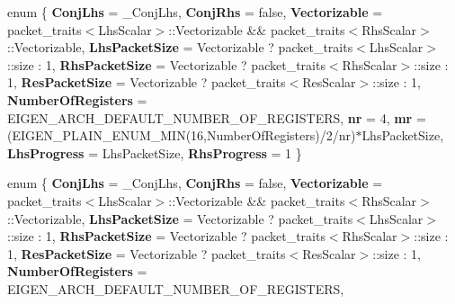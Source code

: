 \begin{DoxyCompactItemize}
\item 
\mbox{\label{class_eigen_1_1internal_1_1gebp__traits_3_01std_1_1complex_3_01_real_scalar_01_4_00_01_real_scald728c008ac4da8a5a1327d1e06be8c1f_a80ead896a5397648ea4a47a4f1d0e569}} 
enum \{ \newline
{\bfseries Conj\+Lhs} = \+\_\+\+Conj\+Lhs, 
{\bfseries Conj\+Rhs} = false, 
{\bfseries Vectorizable} = packet\+\_\+traits$<$Lhs\+Scalar$>$\+:\+:Vectorizable \&\& packet\+\_\+traits$<$Rhs\+Scalar$>$\+:\+:Vectorizable, 
{\bfseries Lhs\+Packet\+Size} = Vectorizable ? packet\+\_\+traits$<$Lhs\+Scalar$>$\+:\+:size \+: 1, 
\newline
{\bfseries Rhs\+Packet\+Size} = Vectorizable ? packet\+\_\+traits$<$Rhs\+Scalar$>$\+:\+:size \+: 1, 
{\bfseries Res\+Packet\+Size} = Vectorizable ? packet\+\_\+traits$<$Res\+Scalar$>$\+:\+:size \+: 1, 
{\bfseries Number\+Of\+Registers} = E\+I\+G\+E\+N\+\_\+\+A\+R\+C\+H\+\_\+\+D\+E\+F\+A\+U\+L\+T\+\_\+\+N\+U\+M\+B\+E\+R\+\_\+\+O\+F\+\_\+\+R\+E\+G\+I\+S\+T\+E\+RS, 
{\bfseries nr} = 4, 
\newline
{\bfseries mr} = (E\+I\+G\+E\+N\+\_\+\+P\+L\+A\+I\+N\+\_\+\+E\+N\+U\+M\+\_\+\+M\+IN(16,Number\+Of\+Registers)/2/nr)$\ast$\+Lhs\+Packet\+Size, 
{\bfseries Lhs\+Progress} = Lhs\+Packet\+Size, 
{\bfseries Rhs\+Progress} = 1
 \}
\item 
\mbox{\label{class_eigen_1_1internal_1_1gebp__traits_3_01std_1_1complex_3_01_real_scalar_01_4_00_01_real_scald728c008ac4da8a5a1327d1e06be8c1f_a4f484ea0a1da743b742ecf4c77f84630}} 
enum \{ \newline
{\bfseries Conj\+Lhs} = \+\_\+\+Conj\+Lhs, 
{\bfseries Conj\+Rhs} = false, 
{\bfseries Vectorizable} = packet\+\_\+traits$<$Lhs\+Scalar$>$\+:\+:Vectorizable \&\& packet\+\_\+traits$<$Rhs\+Scalar$>$\+:\+:Vectorizable, 
{\bfseries Lhs\+Packet\+Size} = Vectorizable ? packet\+\_\+traits$<$Lhs\+Scalar$>$\+:\+:size \+: 1, 
\newline
{\bfseries Rhs\+Packet\+Size} = Vectorizable ? packet\+\_\+traits$<$Rhs\+Scalar$>$\+:\+:size \+: 1, 
{\bfseries Res\+Packet\+Size} = Vectorizable ? packet\+\_\+traits$<$Res\+Scalar$>$\+:\+:size \+: 1, 
{\bfseries Number\+Of\+Registers} = E\+I\+G\+E\+N\+\_\+\+A\+R\+C\+H\+\_\+\+D\+E\+F\+A\+U\+L\+T\+\_\+\+N\+U\+M\+B\+E\+R\+\_\+\+O\+F\+\_\+\+R\+E\+G\+I\+S\+T\+E\+RS, 

\end{DoxyCompactItemize}
